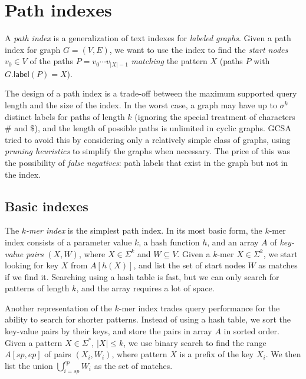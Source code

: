 \documentclass[a4paper,UKenglish]{lipics-v2016}
\newcommand{\abs}[1]{\ensuremath{\lvert #1 \rvert}}
\newcommand{\glabel}{\ensuremath{\mathsf{label}}}
\newcommand{\kmer}[1]{$#1$\nobreakdash-mer}
\begin{document}
\section{Path indexes}

A \emph{path index} is a generalization of text indexes for \emph{labeled graphs}. Given a path index for graph $G = (V, E)$, we want to use the index to find the \emph{start nodes} $v_{0} \in V$ of the paths $P = v_{0} \dotsm v_{\abs{X}-1}$ \emph{matching} the pattern $X$ (paths $P$ with $G.\glabel(P) = X$).

The design of a path index is a trade-off between the maximum supported query length and the size of the index. In the worst case, a graph may have up to $\sigma^{k}$ distinct labels for paths of length $k$ (ignoring the special treatment of characters $\#$ and $\$$), and the length of possible paths is unlimited in cyclic graphs. GCSA \cite{Siren2014} tried to avoid this by considering only a relatively simple class of graphs, using \emph{pruning heuristics} to simplify the graphs when necessary. The price of this was the possibility of \emph{false negatives}: path labels that exist in the graph but not in the index.

\subsection{Basic indexes}

The \emph{\kmer{k} index} is the simplest path index. In its most basic form, the \kmer{k} index consists of a parameter value $k$, a hash function $h$, and an array $A$ of \emph{key-value pairs} $(X, W)$, where $X \in \Sigma^{k}$ and $W \subseteq V$. Given a \kmer{k} $X \in \Sigma^{k}$, we start looking for key $X$ from $A[h(X)]$, and list the set of start nodes $W$ as matches if we find it. Searching using a hash table is fast, but we can only search for patterns of length $k$, and the array requires a lot of space.

Another representation of the \kmer{k} index trades query performance for the ability to search for shorter patterns. Instead of using a hash table, we sort the key-value pairs by their keys, and store the pairs in array $A$ in sorted order. Given a pattern $X \in \Sigma^{\ast}$, $\abs{X} \le k$, we use binary search to find the range $A[sp, ep]$ of pairs $(X_{i}, W_{i})$, where pattern $X$ is a prefix of the key $X_{i}$. We then list the union $\bigcup_{i=sp}^{ep} W_{i}$ as the set of matches.
\end{document}
